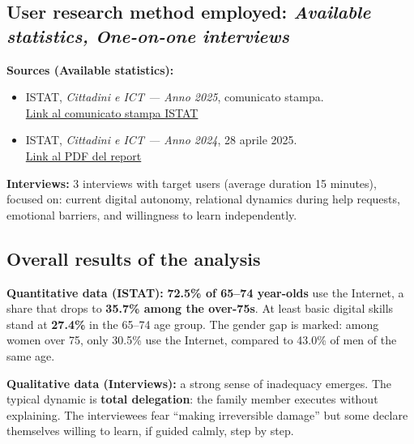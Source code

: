 ﻿\documentclass[11pt,a4paper]{article}
\begin{document}
\subsection*{User research method employed: \textit{Available statistics, One-on-one interviews}}
\begin{tcolorbox}[base]
\textbf{Sources (Available statistics):}
\begin{itemize}[leftmargin=*]
  \item ISTAT, \textit{Cittadini e ICT --- Anno 2025}, comunicato stampa.\\
  \href{https://www.istat.it/comunicato-stampa/cittadini-e-ict-anno-2025/}{Link al comunicato stampa ISTAT}
  \item ISTAT, \textit{Cittadini e ICT --- Anno 2024}, 28 aprile 2025.\\
  \href{https://www.istat.it/wp-content/uploads/2025/04/REPORT_CITTADINI-E-ICT_2024.pdf}{Link al PDF del report}
\end{itemize}

\vspace{0.3cm}
\textbf{Interviews:} 3 interviews with target users (average duration
15 minutes), focused on: current digital autonomy, relational
dynamics during help requests, emotional barriers, and
willingness to learn independently.
\end{tcolorbox}

\subsection*{Overall results of the analysis}
\begin{tcolorbox}[base]
\textbf{Quantitative data (ISTAT):} \textbf{72.5\% of 65--74 year-olds}
use the Internet, a share that drops to \textbf{35.7\% among the over-75s}.
At least basic digital skills stand at \textbf{27.4\%}
in the 65--74 age group. The gender gap is marked: among women
over 75, only 30.5\% use the Internet, compared to 43.0\% of
men of the same age.

\vspace{0.2cm}
\textbf{Qualitative data (Interviews):} a strong sense of
inadequacy emerges. The typical dynamic is \textbf{total delegation}: the
family member executes without explaining. The interviewees fear ``making
irreversible damage'' but some declare themselves willing to learn,
if guided calmly, step by step.
\end{tcolorbox}
\end{document}
